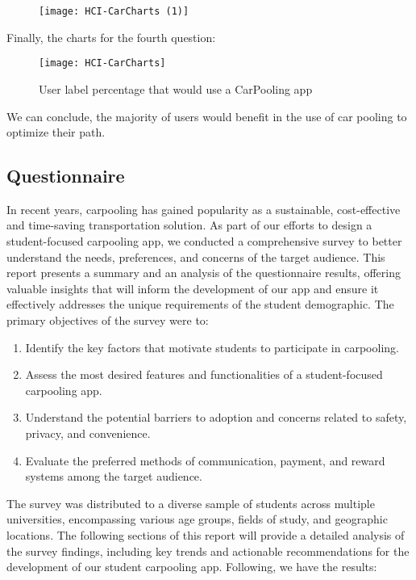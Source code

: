 \documentclass{article}
\begin{document}
\begin{figure}[htbp]
  \centering
     \texttt{[image: HCI-CarCharts (1)]}
\end{figure}
\newpage

Finally, the charts for the fourth question:

\begin{figure}[htbp]
  \centering
     \texttt{[image: HCI-CarCharts]}
     \caption{User label percentage that would use a CarPooling app}
\end{figure}
We can conclude, the majority of users would benefit in the use of car pooling to optimize their path.

\subsection{Questionnaire}
\graphicspath{{Doc images/Need Finding/GForm}}
In recent years, carpooling has gained popularity as a sustainable, cost-effective and time-saving transportation solution. As part of our efforts to design a student-focused carpooling app, we conducted a comprehensive survey to better understand the needs, preferences, and concerns of the target audience. This report presents a summary and an analysis of the questionnaire results, offering valuable insights that will inform the development of our app and ensure it effectively addresses the unique requirements of the student demographic. The primary objectives of the survey were to: 

\begin{enumerate}
    \item Identify the key factors that motivate students to participate in carpooling.
    \item Assess the most desired features and functionalities of a student-focused carpooling app.
    \item Understand the potential barriers to adoption and concerns related to safety, privacy, and convenience.
    \item Evaluate the preferred methods of communication, payment, and reward systems among the target audience.
\end{enumerate}
\newpage

The survey was distributed to a diverse sample of students across multiple universities, encompassing various age groups, fields of study, and geographic locations. The following sections of this report will provide a detailed analysis of the survey findings, including key trends and actionable recommendations for the development of our student carpooling app. Following, we have the results: \newline \newline
\end{document}

